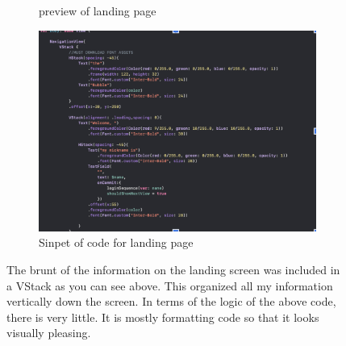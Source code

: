 \documentclass[a4paper, 11pt]{report}
\begin{document}
\begin{figure}
\begin{subfigure}[h]{0.5\textwidth}
    \caption{preview of landing page}
    \label{fig:image1}
  \end{subfigure}
  \hfill
  \begin{subfigure}[h]{0.7\textwidth}
    \includegraphics[width=\textwidth]{2.png}
    \caption{Sinpet of code for landing page}
    \label{fig:image2}
  \end{subfigure}
  \caption{The brunt of the information on the landing screen was included in a VStack as you can see above. This organized all my information vertically down the screen. In terms of the logic of the above code, there is very little. It is mostly formatting code so that it looks visually pleasing.\\}
  \label{fig:images}
\end{figure}
\end{document}
